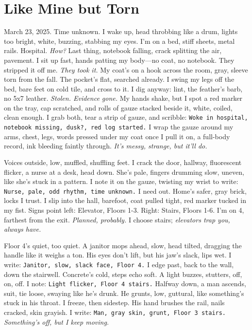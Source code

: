 \documentclass[12pt,oneside]{book}
\newcommand{\note}[1]{\texttt{#1}}
\begin{document}
\chapter{Like Mine but Torn}

March 23, 2025. Time unknown. I wake up, head throbbing like a drum, lights too bright, white, buzzing, stabbing my eyes. I’m on a bed, stiff sheets, metal rails. Hospital. \textit{How?} Last thing, notebook falling, crack splitting the air, pavement. I sit up fast, hands patting my body—no coat, no notebook. They stripped it off me. \textit{They took it.} My coat’s on a hook across the room, gray, sleeve torn from the fall. The pocket’s flat, searched already. I swing my legs off the bed, bare feet on cold tile, and cross to it. I dig anyway: lint, the feather’s barb, no 5x7 leather. \textit{Stolen. Evidence gone.} My hands shake, but I spot a red marker on the tray, cap scratched, and rolls of gauze stacked beside it, white, coiled, clean enough. I grab both, tear a strip of gauze, and scribble: \note{Woke in hospital, notebook missing, dusk?, red log started.} I wrap the gauze around my arms, chest, legs, words pressed under my coat once I pull it on, a full-body record, ink bleeding faintly through. \textit{It’s messy, strange, but it’ll do.}

Voices outside, low, muffled, shuffling feet. I crack the door, hallway, fluorescent flicker, a nurse at a desk, head down. She’s pale, fingers drumming slow, uneven, like she’s stuck in a pattern. I note it on the gauze, twisting my wrist to write: \note{Nurse, pale, odd rhythm, time unknown.} I need out. Home’s safer, gray brick, locks I trust. I slip into the hall, barefoot, coat pulled tight, red marker tucked in my fist. Signs point left: Elevator, Floors 1-3. Right: Stairs, Floors 1-6. I’m on 4, farthest from the exit. \textit{Planned, probably.} I choose stairs; \textit{elevators trap you, always have.}

Floor 4’s quiet, too quiet. A janitor mops ahead, slow, head tilted, dragging the handle like it weighs a ton. His eyes don’t lift, but his jaw’s slack, lips wet. I write: \note{Janitor, slow, slack face, Floor 4.} I edge past, back to the wall, down the stairwell. Concrete’s cold, steps echo soft. A light buzzes, stutters, off, on, off. I note: \note{Light flicker, Floor 4 stairs.} Halfway down, a man ascends, suit, tie loose, swaying like he’s drunk. He grunts, low, guttural, like something’s stuck in his throat. I freeze, then sidestep. His hand brushes the rail, nails cracked, skin grayish. I write: \note{Man, gray skin, grunt, Floor 3 stairs.} \textit{Something’s off, but I keep moving.}
\end{document}
